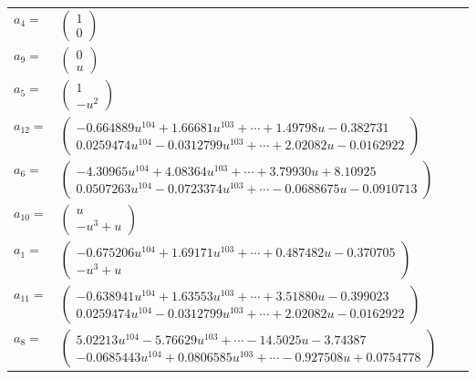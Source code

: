 \documentclass[1p]{elsarticle_modified}
\theoremstyle{definition}
\begin{document}
\begin{tabular}{m{7pt} m{180pt} m{7pt} m{180pt} }
\flushright $a_{4}=$&$\begin{pmatrix}1\\0\end{pmatrix}$ \\
\flushright $a_{9}=$&$\begin{pmatrix}0\\u\end{pmatrix}$ \\
\flushright $a_{5}=$&$\begin{pmatrix}1\\- u^2\end{pmatrix}$ \\
\flushright $a_{12}=$&$\begin{pmatrix}-0.664889 u^{104}+1.66681 u^{103}+\cdots+1.49798 u-0.382731\\0.0259474 u^{104}-0.0312799 u^{103}+\cdots+2.02082 u-0.0162922\end{pmatrix}$ \\
\flushright $a_{6}=$&$\begin{pmatrix}-4.30965 u^{104}+4.08364 u^{103}+\cdots+3.79930 u+8.10925\\0.0507263 u^{104}-0.0723374 u^{103}+\cdots-0.0688675 u-0.0910713\end{pmatrix}$ \\
\flushright $a_{10}=$&$\begin{pmatrix}u\\- u^3+u\end{pmatrix}$ \\
\flushright $a_{1}=$&$\begin{pmatrix}-0.675206 u^{104}+1.69171 u^{103}+\cdots+0.487482 u-0.370705\\- u^3+u\end{pmatrix}$ \\
\flushright $a_{11}=$&$\begin{pmatrix}-0.638941 u^{104}+1.63553 u^{103}+\cdots+3.51880 u-0.399023\\0.0259474 u^{104}-0.0312799 u^{103}+\cdots+2.02082 u-0.0162922\end{pmatrix}$ \\
\flushright $a_{8}=$&$\begin{pmatrix}5.02213 u^{104}-5.76629 u^{103}+\cdots-14.5025 u-3.74387\\-0.0685443 u^{104}+0.0806585 u^{103}+\cdots-0.927508 u+0.0754778\end{pmatrix}$ \\

\end{tabular}
\end{document}
